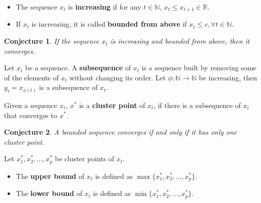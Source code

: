 \documentclass[aspectratio=169]{beamer}
\newtheorem{proposition}{Conjecture}[section]
\begin{document}
\begin{frame}
    \begin{definition}
    \begin{itemize}
        \item The sequence $x_t$ is \textbf{increasing} if for any $t\in\mathbb{N}$, $x_t\leq x_{t+1}\in\mathbb{R}$.
        \item If $x_t$ is increasing, it is called \textbf{bounded from above} if $x_t\leq c, \forall t\in\mathbb{N}$.
    \end{itemize}
    \end{definition}
    
    \begin{proposition}
        If the sequence $x_t$ is increasing and bounded from above, then it converges.
    \end{proposition}
\end{frame}

\begin{frame}
    \begin{definition}
        Let $x_t$ be a sequence. A \textbf{subsequence} of $x_t$ is a sequence built by removing some of the elements of $x_t$ without changing its order. Let $\phi:\mathbb{N}\rightarrow\mathbb{N}$ be increasing, then $y_t=x_{\phi(t)}$ is a subsequence of $x_t$.
    \end{definition}
    
    \begin{definition}
        Given a sequence $x_t$, $x^*$ is a \textbf{cluster point} of $x_t$, if there is a subsequence of $x_t$ that converges to $x^*$.
    \end{definition}
\end{frame}

\begin{frame}
\begin{proposition}
    A bounded sequence converges if and only if it has only one cluster point.
\end{proposition}
    
\end{frame}

\begin{frame}

Let $x_1^*,x_2^*,...,x_p^*$ be cluster points of $x_t$.

\begin{definition}
\begin{itemize}
    \item The \textbf{upper bound} of $x_t$ is defined as $\max\{x_1^*,x_2^*,...,x_p^*\}$.
    \item The \textbf{lower bound} of $x_t$ is defined as $\min\{x_1^*,x_2^*,...,x_p^*\}$.
\end{itemize}
\end{definition}
    
\end{frame}
\end{document}
